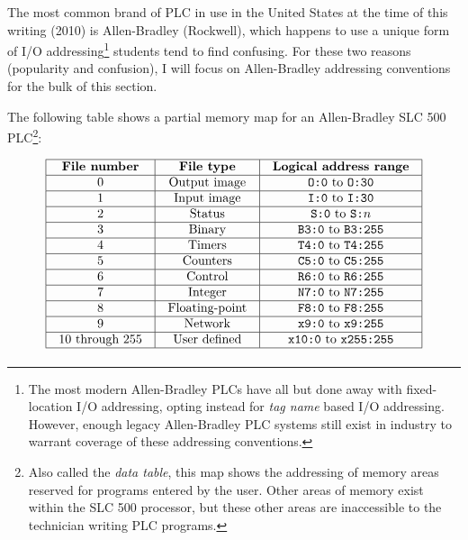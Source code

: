 The most common brand of PLC in use in the United States at the time of this writing (2010) is Allen-Bradley (Rockwell), which happens to use a unique form of I/O addressing\footnote{The most modern Allen-Bradley PLCs have all but done away with fixed-location I/O addressing, opting instead for \textit{tag name} based I/O addressing.  However, enough legacy Allen-Bradley PLC systems still exist in industry to warrant coverage of these addressing conventions.} students tend to find confusing.  For these two reasons (popularity and confusion), I will focus on Allen-Bradley addressing conventions for the bulk of this section.

\filbreak

The following table shows a partial memory map for an Allen-Bradley SLC 500 PLC\footnote{Also called the \textit{data table}, this map shows the addressing of memory areas reserved for programs entered by the user.  Other areas of memory exist within the SLC 500 processor, but these other areas are inaccessible to the technician writing PLC programs.}: 


$$\vbox{\offinterlineskip
\halign{\strut
\vrule \quad\hfil # \ \hfil & 
\vrule \quad\hfil # \ \hfil & 
\vrule \quad\hfil # \ \hfil \vrule \cr
\noalign{\hrule}
%
\textbf{File number} & \textbf{File type} & \textbf{Logical address range} \cr
%
\noalign{\hrule}
%
0 & Output image & \texttt{O:0} to \texttt{O:30} \cr
%
\noalign{\hrule}
%
1 & Input image & \texttt{I:0} to \texttt{I:30} \cr
%
\noalign{\hrule}
%
2 & Status & \texttt{S:0} to \texttt{S:}$n$ \cr
%
\noalign{\hrule}
%
3 & Binary & \texttt{B3:0} to \texttt{B3:255} \cr
%
\noalign{\hrule}
%
4 & Timers & \texttt{T4:0} to \texttt{T4:255} \cr
%
\noalign{\hrule}
%
5 & Counters & \texttt{C5:0} to \texttt{C5:255} \cr
%
\noalign{\hrule}
%
6 & Control & \texttt{R6:0} to \texttt{R6:255} \cr
%
\noalign{\hrule}
%
7 & Integer & \texttt{N7:0} to \texttt{N7:255} \cr
%
\noalign{\hrule}
%
8 & Floating-point & \texttt{F8:0} to \texttt{F8:255} \cr
%
\noalign{\hrule}
%
9 & Network & \texttt{x9:0} to \texttt{x9:255} \cr
%
\noalign{\hrule}
%
10 through 255 & User defined & \texttt{x10:0} to \texttt{x255:255} \cr
%
\noalign{\hrule}
} %
}$$ %

